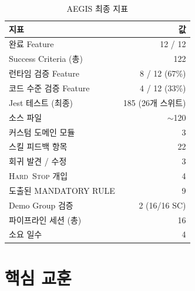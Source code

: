 \documentclass[11pt,a4paper,openright,twoside]{report}
\newcommand{\hardstop}{\textsc{Hard~Stop}}
\begin{document}
\begin{table}[H]
\centering
\caption{AEGIS 최종 지표}
\label{tab:aegis-metrics-ko}
\begin{tabularx}{\textwidth}{Xr}
\toprule
\textbf{지표} & \textbf{값} \\
\midrule
완료 Feature & 12 / 12 \\
Success Criteria (총) & 122 \\
런타임 검증 Feature & 8 / 12 (67\%) \\
코드 수준 검증 Feature & 4 / 12 (33\%) \\
Jest 테스트 (최종) & 185 (26개 스위트) \\
소스 파일 & $\sim$120 \\
커스텀 도메인 모듈 & 3 \\
스킬 피드백 항목 & 22 \\
회귀 발견 / 수정 & 3 \\
\hardstop{} 개입 & 4 \\
도출된 MANDATORY RULE & 9 \\
Demo Group 검증 & 2 (16/16 SC) \\
파이프라인 세션 (총) & 16 \\
소요 일수 & 4 \\
\bottomrule
\end{tabularx}
\end{table}

\section{핵심 교훈}
\end{document}

